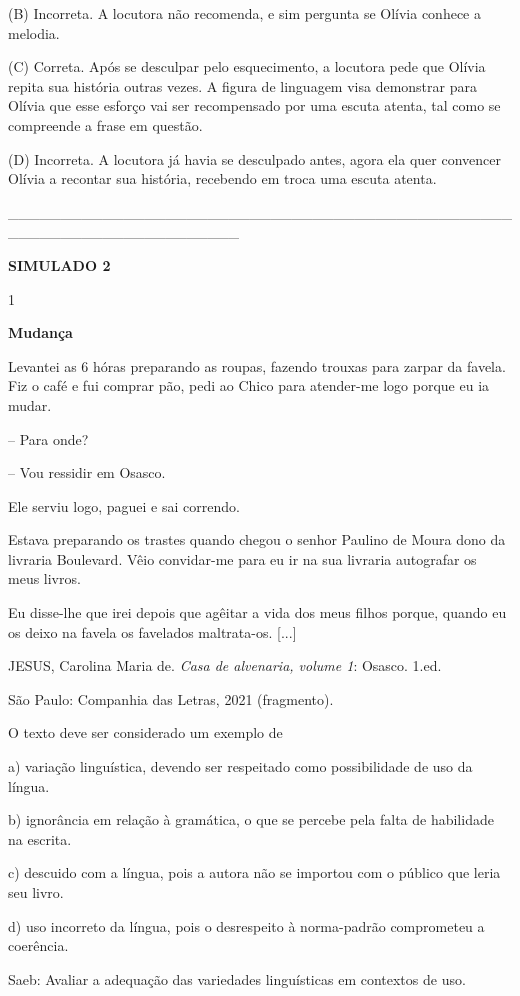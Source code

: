 (B) Incorreta. A locutora não recomenda, e sim pergunta se Olívia
conhece a melodia.

(C) Correta. Após se desculpar pelo esquecimento, a locutora pede que
Olívia repita sua história outras vezes. A figura de linguagem visa
demonstrar para Olívia que esse esforço vai ser recompensado por uma
escuta atenta, tal como se compreende a frase em questão.

(D) Incorreta. A locutora já havia se desculpado antes, agora ela quer
convencer Olívia a recontar sua história, recebendo em troca uma escuta
atenta.

\_\_\_\_\_\_\_\_\_\_\_\_\_\_\_\_\_\_\_\_\_\_\_\_\_\_\_\_\_\_\_\_\_\_\_\_\_\_\_\_\_\_\_\_\_\_\_\_\_\_\_\_\_\_\_\_\_\_\_\_\_\_\_\_\_\_\_\_\_\_

\textbf{SIMULADO 2}

\num{1}

\textbf{Mudança}

Levantei as 6 hóras preparando as roupas, fazendo trouxas para zarpar da
favela. Fiz o café e fui comprar pão, pedi ao Chico para atender-me logo
porque eu ia mudar.

-- Para onde?

-- Vou ressidir em Osasco.

Ele serviu logo, paguei e sai correndo.

Estava preparando os trastes quando chegou o senhor Paulino de Moura
dono da livraria Boulevard. Vêio convidar-me para eu ir na sua livraria
autografar os meus livros.

Eu disse-lhe que irei depois que agêitar a vida dos meus filhos porque,
quando eu os deixo na favela os favelados maltrata-os. {[}...{]}

JESUS, Carolina Maria de. \emph{Casa de alvenaria, volume 1}: Osasco.
1.ed.

São Paulo: Companhia das Letras, 2021 (fragmento).

O texto deve ser considerado um exemplo de

a) variação linguística, devendo ser respeitado como possibilidade de
uso da língua.

b) ignorância em relação à gramática, o que se percebe pela falta de
habilidade na escrita.

c) descuido com a língua, pois a autora não se importou com o público
que leria seu livro.

d) uso incorreto da língua, pois o desrespeito à norma-padrão
comprometeu a coerência.

Saeb: Avaliar a adequação das variedades linguísticas em contextos de
uso.

